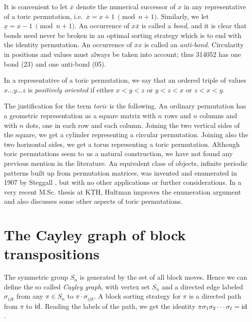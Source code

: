 \documentclass[11pt]{amsart} %
\newcommand{\id}{\mathop{\rm id}}
\newcommand{\xbar}{\overline{x}}
\begin{document}
It is convenient to let $\xbar$ denote the numerical successor of
$x$ in  any representative of a 
toric permutation, i.e.~$\xbar=x\!+\!1\ \pmod{n\!\!+\!\!1}$.
Similarly, we let $\underline{x}=x\!-\!1\ \pmod{n\!\!+\!\!1}$. An
occurrence of $x\xbar$ is called a {\em bond}, and it is clear
that bonds need never be broken in an optimal sorting strategy
which is to end  with the identity permutation. An
occurrence of $\xbar x$ is called an {\em anti-bond}.
Circularity in positions and values must always be taken into
account; thus 314052 has one bond (23) and one anti-bond (05).

In a representative of a toric permutation, we say that an ordered triple of values
$x\ldots y \ldots z$ is {\em positively oriented} if
either $x<y<z$ or $y<z<x$ or $z<x<y$.

The justification for the term {\em toric} is the following. An
ordinary permutation has a geometric representation as a square
matrix with $n$ rows and $n$ columns and with $n$ dots, one in
each row and each column. Joining the two vertical sides of the
square, we get a cylinder representing a circular permutation.
Joining also the two horizontal sides, we get a torus representing
a toric permutation. Although toric permutations seem to us a natural
construction, we have not found any previous mention in the literature.
An equivalent class of objects, infinite periodic patterns built up
from permutation matrices, was invented and enumerated in 1907 by Steggall
\cite{St}, but with no other applications or further considerations. 
In a very recent M.Sc. thesis at KTH, Hultman \cite{Hu} improves the
enumeration argument and also discusses some other aspects of
toric permutations.

\section{The Cayley graph of block transpositions}
\noindent
The symmetric group $S_n$ is generated by the set
of all block moves.  Hence we can define the so called {\em Cayley
graph}, with vertex set $S_n$ and a directed edge labeled
$\sigma_{ijk}$ from any $\pi\in S_n$ to $\pi \cdot \sigma_{ijk}$.
A block sorting strategy for $\pi$ is a directed path from $\pi$
to $\id$.  Reading the labels of the path,
we get the identity $\pi \sigma_1 \sigma_2 \cdots \sigma_\ell =
\id$.
\end{document}
